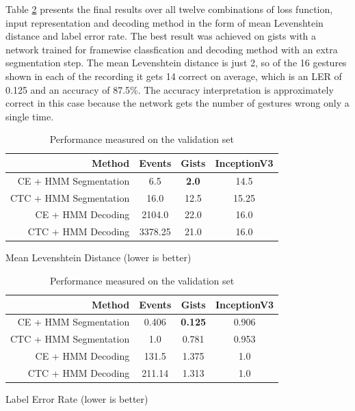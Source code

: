 Table \ref{tab:ler} presents the final results over all twelve combinations of
loss function, input representation and decoding method in the form of mean
Levenshtein distance and label error rate. The best result was achieved on gists
with a network trained for framewise classfication and decoding method with an
extra segmentation step. The mean Levenshtein distance is just 2, so of the 16
gestures shown in each of the recording it gets 14 correct on average, which is
an LER of 0.125 and an accuracy of 87.5\%. The accuracy interpretation is
approximately correct in this case because the network gets the number of
gestures wrong only a single time.

\begin{table}[h]
  \centering
  \begin{subtable}{\textwidth}
    \centering
    \begin{tabular}{r|c|c|c}
Method & Events & Gists & InceptionV3\\
\hline
CE + HMM Segmentation & 6.5 & \textbf{2.0} & 14.5\\
CTC + HMM Segmentation & 16.0 & 12.5 & 15.25\\
CE + HMM Decoding & 2104.0 & 22.0 & 16.0\\
CTC + HMM Decoding & 3378.25 & 21.0 & 16.0\\
    \end{tabular}
    \caption{Mean Levenshtein Distance (lower is better)}
  \end{subtable}
  \par\bigskip
  \begin{subtable}{\textwidth}
    \centering
    \begin{tabular}{r|c|c|c}
Method & Events & Gists & InceptionV3\\
\hline
CE + HMM Segmentation & 0.406 & \textbf{0.125} & 0.906\\
CTC + HMM Segmentation & 1.0 & 0.781 & 0.953\\
CE + HMM Decoding & 131.5 & 1.375 & 1.0\\
CTC + HMM Decoding & 211.14 & 1.313 & 1.0\\
    \end{tabular}
    \caption{Label Error Rate (lower is better)}
  \end{subtable}
  \caption{Performance measured on the validation set}
  \label{tab:ler}
\end{table}

